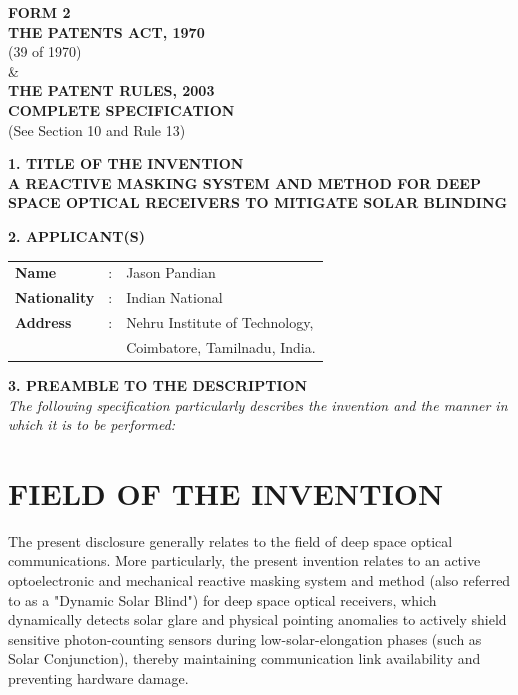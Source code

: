 \documentclass[12pt,a4paper]{article}
\begin{document}
\begin{center}
    \textbf{\large FORM 2} \\
    \vspace{0.3cm}
    \textbf{THE PATENTS ACT, 1970} \\
    (39 of 1970) \\
    \& \\
    \textbf{THE PATENT RULES, 2003} \\
    \vspace{0.5cm}
    \textbf{\large COMPLETE SPECIFICATION} \\
    (See Section 10 and Rule 13) \\
    \vspace{1cm}
    
    \textbf{\Large 1. TITLE OF THE INVENTION} \\
    \vspace{0.5cm}
    \textbf{\large A REACTIVE MASKING SYSTEM AND METHOD FOR DEEP SPACE OPTICAL RECEIVERS TO MITIGATE SOLAR BLINDING} \\
    \vspace{1.5cm}
    
    \textbf{\Large 2. APPLICANT(S)} \\
    \vspace{0.5cm}
    \begin{tabular}{lll}
        \textbf{Name} & : & Jason Pandian \\
        \textbf{Nationality} & : & Indian National \\
        \textbf{Address} & : & Nehru Institute of Technology, \\
                         &   & Coimbatore, Tamilnadu, India. \\
    \end{tabular}
    \vspace{1.5cm}
    
    \textbf{\Large 3. PREAMBLE TO THE DESCRIPTION} \\
    \vspace{0.5cm}
    \textit{The following specification particularly describes the invention and the manner in which it is to be performed:}
\end{center}

\newpage

\section*{FIELD OF THE INVENTION}
The present disclosure generally relates to the field of deep space optical communications. More particularly, the present invention relates to an active optoelectronic and mechanical reactive masking system and method (also referred to as a "Dynamic Solar Blind") for deep space optical receivers, which dynamically detects solar glare and physical pointing anomalies to actively shield sensitive photon-counting sensors during low-solar-elongation phases (such as Solar Conjunction), thereby maintaining communication link availability and preventing hardware damage.
\end{document}
